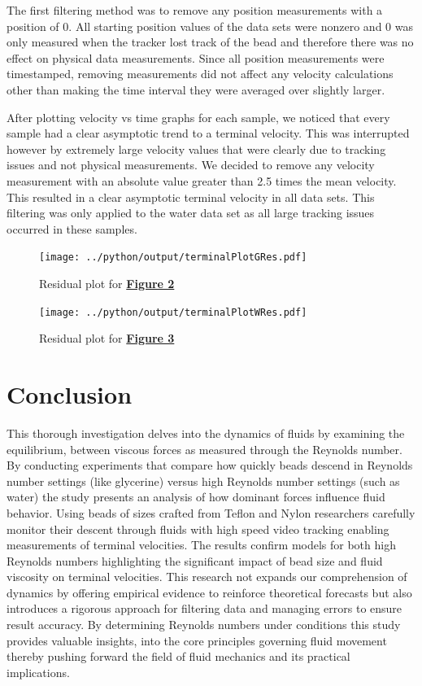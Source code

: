 \documentclass[
	letterpaper
	12pt
]{template}
\newcommand{\bref}[2]{\textbf{\hyperref[#1]{#2}}}
\begin{document}
The first filtering method was to remove any position measurements with a position of $0$. All starting position values of the data sets were nonzero and $0$ was only measured when the tracker lost track of the bead and therefore there was no effect on physical data measurements. Since all position measurements were timestamped, removing measurements did not affect any velocity calculations other than making the time interval they were averaged over slightly larger.\vspace{\baselineskip}

After plotting velocity vs time graphs for each sample, we noticed that every sample had a clear asymptotic trend to a terminal velocity. This was interrupted however by extremely large velocity values that were clearly due to tracking issues and not physical measurements. We decided to remove any velocity measurement with an absolute value greater than 2.5 times the mean velocity. This resulted in a clear asymptotic terminal velocity in all data sets. This filtering was only applied to the water data set as all large tracking issues occurred in these samples.

\begin{figure}[H]
	\begin{minipage}[t]{0.45\textwidth}
		\label{fig::terminalPlotGRes}
		\centering
		\texttt{[image: ../python/output/terminalPlotGRes.pdf]}
		\caption{Residual plot for \bref{fig::terminalPlotG}{Figure 2}}
	\end{minipage}
	\hfill
	\begin{minipage}[t]{0.45\textwidth}
		\label{fig::terminalPlotWRes}
		\centering
		\texttt{[image: ../python/output/terminalPlotWRes.pdf]}
		\caption{Residual plot for \bref{fig::terminalPlotW}{Figure 3}}
	\end{minipage}
\end{figure}

\section{Conclusion}
This thorough investigation delves into the dynamics of fluids by examining the equilibrium, between viscous forces as measured through the Reynolds number. By conducting experiments that compare how quickly beads descend in Reynolds number settings (like glycerine) versus high Reynolds number settings (such as water) the study presents an analysis of how dominant forces influence fluid behavior. Using beads of sizes crafted from Teflon and Nylon researchers carefully monitor their descent through fluids with high speed video tracking enabling measurements of terminal velocities. The results confirm models for both high Reynolds numbers highlighting the significant impact of bead size and fluid viscosity on terminal velocities. This research not expands our comprehension of dynamics by offering empirical evidence to reinforce theoretical forecasts but also introduces a rigorous approach for filtering data and managing errors to ensure result accuracy. By determining Reynolds numbers under conditions this study provides valuable insights, into the core principles governing fluid movement thereby pushing forward the field of fluid mechanics and its practical implications.
\newpage


\newpage


\end{document}
